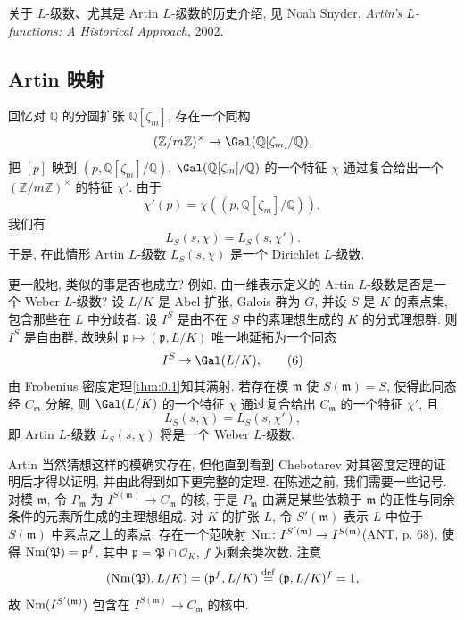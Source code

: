 \begin{NOTES}
关于 $L$-级数、尤其是 Artin $L$-级数的历史介绍, 见 Noah Snyder, \emph{Artin's $L$-functions: A Historical Approach}, 2002\cite{Snyder2002}.
\end{NOTES}

\subsection*{Artin 映射}

回忆对 $\mathbb{Q}$ 的分圆扩张 $\mathbb{Q}[\zeta_{m}]$, 存在一个同构
\[
(\mathbb{Z}/m\mathbb{Z})^{\times} \to \Gal(\mathbb{Q}[\zeta_{m}]/\mathbb{Q}),
\]
把 $[p]$ 映到 $(p, \mathbb{Q}[\zeta_{m}]/\mathbb{Q})$. $\Gal(\mathbb{Q}[\zeta_{m}]/\mathbb{Q})$ 的一个特征 $\chi$ 通过复合给出一个 $(\mathbb{Z}/m\mathbb{Z})^{\times}$ 的特征 $\chi'$. 由于
\[
\chi'(p) = \chi((p, \mathbb{Q}[\zeta_{m}]/\mathbb{Q})),
\]
我们有
\[
L_{S}(s, \chi) = L_{S}(s, \chi').
\]
于是, 在此情形 Artin $L$-级数 $L_{S}(s, \chi)$ 是一个 Dirichlet $L$-级数.

更一般地, 类似的事是否也成立? 例如, 由一维表示定义的 Artin $L$-级数是否是一个 Weber $L$-级数? 设 $L/K$ 是 Abel 扩张, Galois 群为 $G$, 并设 $S$ 是 $K$ 的素点集, 包含那些在 $L$ 中分歧者. 设 $I^{S}$ 是由不在 $S$ 中的素理想生成的 $K$ 的分式理想群. 则 $I^{S}$ 是自由群, 故映射 $\mathfrak{p} \mapsto (\mathfrak{p}, L/K)$ 唯一地延拓为一个同态
\begin{equation*}
I^{S} \to \Gal(L/K),\tag{6}
\end{equation*}
由 Frobenius 密度定理\ref{thm:0.1}知其满射. 若存在模 $\mathfrak{m}$ 使 $S(\mathfrak{m}) = S$, 使得此同态经 $C_{\mathfrak{m}}$ 分解, 则 $\Gal(L/K)$ 的一个特征 $\chi$ 通过复合给出 $C_{\mathfrak{m}}$ 的一个特征 $\chi'$, 且
\[
L_{S}(s, \chi) = L_{S}(s, \chi'),
\]
即 Artin $L$-级数 $L_{S}(s, \chi)$ 将是一个 Weber $L$-级数.

Artin 当然猜想这样的模确实存在, 但他直到看到 Chebotarev 对其密度定理的证明后才得以证明, 并由此得到如下更完整的定理. 在陈述之前, 我们需要一些记号. 对模 $\mathfrak{m}$, 令 $P_{\mathfrak{m}}$ 为 $I^{S(\mathfrak{m})} \to C_{\mathfrak{m}}$ 的核, 于是 $P_{\mathfrak{m}}$ 由满足某些依赖于 $\mathfrak{m}$ 的正性与同余条件的元素所生成的主理想组成. 对 $K$ 的扩张 $L$, 令 $S'(\mathfrak{m})$ 表示 $L$ 中位于 $S(\mathfrak{m})$ 中素点之上的素点. 存在一个范映射 $\operatorname{Nm} \colon I^{S'(\mathfrak{m})} \to I^{S(\mathfrak{m})}$(ANT, p. 68), 使得 $\operatorname{Nm}(\mathfrak{P}) = \mathfrak{p}^{f}$, 其中 $\mathfrak{p} = \mathfrak{P} \cap \mathcal{O}_{K}$, $f$ 为剩余类次数. 注意
\[
(\operatorname{Nm}(\mathfrak{P}), L/K) = (\mathfrak{p}^{f}, L/K) \overset{\mathrm{def}}{=} (\mathfrak{p}, L/K)^{f} = 1,
\]
故 $\operatorname{Nm}(I^{S'(\mathfrak{m})})$ 包含在 $I^{S(\mathfrak{m})} \to C_{\mathfrak{m}}$ 的核中.

